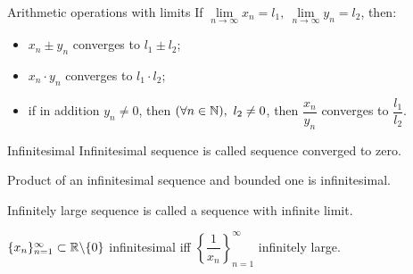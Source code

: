 \begin{theorema}{Arithmetic operations with limits}{}
    If $\lim\limits_{n\to \infty} x_n = l_1, \ \lim\limits_{n\to\infty} y_n = l_2$, then:
    \begin{itemize}
        \item $x_n \pm y_n$ converges to $l_1 \pm l_2$;
        \item $x_n\cdot y_n$ converges to $l_1\cdot l_2$;
        \item if in addition $y_n \neq 0$, then $(\forall n \in \mathbb{N}), \ l_2 \neq 0$, then $\dfrac{x_n}{y_n}$ converges to $\dfrac{l_1}{l_2}$.
    \end{itemize}
\end{theorema}
\begin{definition}{Infinitesimal}{}
    Infinitesimal sequence is called sequence converged to zero.
\end{definition}

\begin{theorema}{}{}
  Product of an infinitesimal sequence and bounded one is infinitesimal.  
\end{theorema}

\begin{definition}
    Infinitely large sequence is called a sequence with infinite limit.
\end{definition}

\begin{theorema}{}{}
  $\{x_n\}_{n=1}^\infty \subset \mathbb{R} \backslash \{0\}$ infinitesimal iff $\left\{\dfrac{1}{x_n}\right\}_{n=1}^\infty$ infinitely large.
\end{theorema}